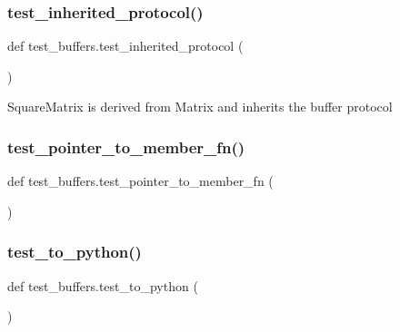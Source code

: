 \mbox{\label{namespacetest__buffers_ad572849246603d1d882b05b4883a966f}} 
\subsubsection{\texorpdfstring{test\_inherited\_protocol()}{test\_inherited\_protocol()}}
{\footnotesize\ttfamily def test\+\_\+buffers.\+test\+\_\+inherited\+\_\+protocol (\begin{DoxyParamCaption}{ }\end{DoxyParamCaption})}

\begin{DoxyVerb}SquareMatrix is derived from Matrix and inherits the buffer protocol\end{DoxyVerb}
 \mbox{\label{namespacetest__buffers_abe5e9f45aa6ce0ac458e7b4fbf51b2f0}} 
\subsubsection{\texorpdfstring{test\_pointer\_to\_member\_fn()}{test\_pointer\_to\_member\_fn()}}
{\footnotesize\ttfamily def test\+\_\+buffers.\+test\+\_\+pointer\+\_\+to\+\_\+member\+\_\+fn (\begin{DoxyParamCaption}{ }\end{DoxyParamCaption})}

\mbox{\label{namespacetest__buffers_a4a406e49d9e743c397822899d9187b98}} 
\subsubsection{\texorpdfstring{test\_to\_python()}{test\_to\_python()}}
{\footnotesize\ttfamily def test\+\_\+buffers.\+test\+\_\+to\+\_\+python (\begin{DoxyParamCaption}{ }\end{DoxyParamCaption})}



